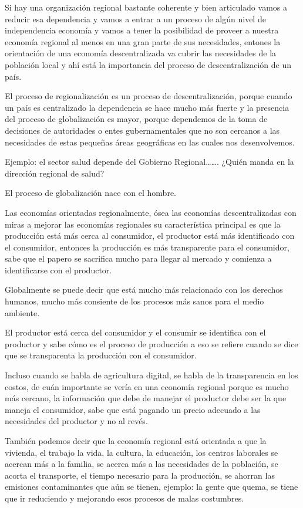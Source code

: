 \documentclass[
  a4paper,
]{article}
\begin{document}
Si hay una organización regional bastante coherente y bien articulado
vamos a reducir esa dependencia y vamos a entrar a un proceso de algún
nivel de independencia economía y vamos a tener la posibilidad de
proveer a nuestra economía regional al menos en una gran parte de sus
necesidades, entones la orientación de una economía descentralizada va
cubrir las necesidades de la población local y ahí está la importancia
del proceso de descentralización de un país.

El proceso de regionalización es un proceso de descentralización, porque
cuando un país es centralizado la dependencia se hace mucho más fuerte y
la presencia del proceso de globalización es mayor, porque dependemos de
la toma de decisiones de autoridades o entes gubernamentales que no son
cercanos a las necesidades de estas pequeñas áreas geográficas en las
cuales nos desenvolvemos.

Ejemplo: el sector salud depende del Gobierno Regional\ldots\ldots.
¿Quién manda en la dirección regional de salud?

El proceso de globalización nace con el hombre.

Las economías orientadas regionalmente, ósea las economías
descentralizadas con miras a mejorar las economías regionales su
característica principal es que la producción está más cerca al
consumidor, el productor está más identificado con el consumidor,
entonces la producción es más transparente para el consumidor, sabe que
el papero se sacrifica mucho para llegar al mercado y comienza a
identificarse con el productor.

Globalmente se puede decir que está mucho más relacionado con los
derechos humanos, mucho más consiente de los procesos más sanos para el
medio ambiente.

El productor está cerca del consumidor y el consumir se identifica con
el productor y sabe cómo es el proceso de producción a eso se refiere
cuando se dice que se transparenta la producción con el consumidor.

Incluso cuando se habla de agricultura digital, se habla de la
transparencia en los costos, de cuán importante se vería en una economía
regional porque es mucho más cercano, la información que debe de manejar
el productor debe ser la que maneja el consumidor, sabe que está pagando
un precio adecuado a las necesidades del productor y no al revés.

También podemos decir que la economía regional está orientada a que la
vivienda, el trabajo la vida, la cultura, la educación, los centros
laborales se acercan más a la familia, se acerca más a las necesidades
de la población, se acorta el transporte, el tiempo necesario para la
producción, se ahorran las emisiones contaminantes que aún se tienen,
ejemplo: la gente que quema, se tiene que ir reduciendo y mejorando esos
procesos de malas costumbres.
\end{document}
